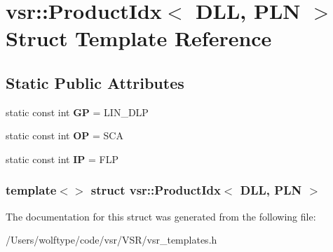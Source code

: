 \hypertarget{structvsr_1_1_product_idx_3_01_d_l_l_00_01_p_l_n_01_4}{\section{vsr\-:\-:Product\-Idx$<$ D\-L\-L, P\-L\-N $>$ Struct Template Reference}
\label{structvsr_1_1_product_idx_3_01_d_l_l_00_01_p_l_n_01_4}
}
\subsection*{Static Public Attributes}
\begin{DoxyCompactItemize}
\item 
\hypertarget{structvsr_1_1_product_idx_3_01_d_l_l_00_01_p_l_n_01_4_ab5d1f3c3fe14291de12f2eeb347866b7}{static const int {\bfseries G\-P} = L\-I\-N\-\_\-\-D\-L\-P}\label{structvsr_1_1_product_idx_3_01_d_l_l_00_01_p_l_n_01_4_ab5d1f3c3fe14291de12f2eeb347866b7}

\item 
\hypertarget{structvsr_1_1_product_idx_3_01_d_l_l_00_01_p_l_n_01_4_aeb169c1ce41e33fd785158a721ee05c5}{static const int {\bfseries O\-P} = S\-C\-A}\label{structvsr_1_1_product_idx_3_01_d_l_l_00_01_p_l_n_01_4_aeb169c1ce41e33fd785158a721ee05c5}

\item 
\hypertarget{structvsr_1_1_product_idx_3_01_d_l_l_00_01_p_l_n_01_4_adf07ad64849c2421e593fd933059403a}{static const int {\bfseries I\-P} = F\-L\-P}\label{structvsr_1_1_product_idx_3_01_d_l_l_00_01_p_l_n_01_4_adf07ad64849c2421e593fd933059403a}

\end{DoxyCompactItemize}
\subsubsection*{template$<$$>$ struct vsr\-::\-Product\-Idx$<$ D\-L\-L, P\-L\-N $>$}



The documentation for this struct was generated from the following file\-:\begin{DoxyCompactItemize}
\item 
/\-Users/wolftype/code/vsr/\-V\-S\-R/vsr\-\_\-templates.\-h\end{DoxyCompactItemize}
